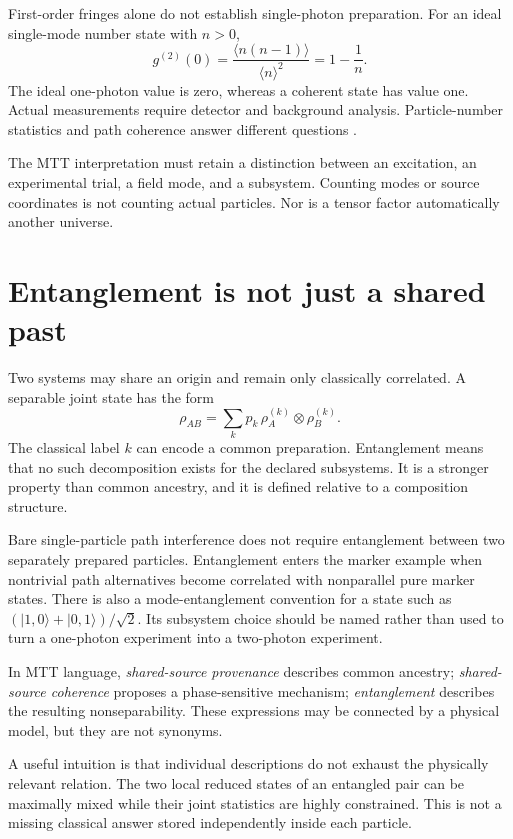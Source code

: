 \documentclass[11pt,a4paper]{article}
\newcommand{\ket}[1]{\lvert #1\rangle}
\begin{document}
First-order fringes alone do not establish single-photon preparation. For an ideal single-mode number state with \(n>0\),
\begin{equation}
g^{(2)}(0)=\frac{\langle n(n-1)\rangle}{\langle n\rangle^2}
         =1-\frac1n.
\end{equation}
The ideal one-photon value is zero, whereas a coherent state has value one. Actual measurements require detector and background analysis. Particle-number statistics and path coherence answer different questions \cite{Glauber,Grangier}.

The MTT interpretation must retain a distinction between an excitation, an experimental trial, a field mode, and a subsystem. Counting modes or source coordinates is not counting actual particles. Nor is a tensor factor automatically another universe.

\section{Entanglement is not just a shared past}
\label{sec:entanglement}
Two systems may share an origin and remain only classically correlated. A separable joint state has the form
\begin{equation}
\rho_{AB}=\sum_k p_k\,\rho_A^{(k)}\otimes\rho_B^{(k)}.
\end{equation}
The classical label \(k\) can encode a common preparation. Entanglement means that no such decomposition exists for the declared subsystems. It is a stronger property than common ancestry, and it is defined relative to a composition structure.

Bare single-particle path interference does not require entanglement between two separately prepared particles. Entanglement enters the marker example when nontrivial path alternatives become correlated with nonparallel pure marker states. There is also a mode-entanglement convention for a state such as \((\ket{1,0}+\ket{0,1})/\sqrt2\). Its subsystem choice should be named rather than used to turn a one-photon experiment into a two-photon experiment.

In MTT language, \emph{shared-source provenance} describes common ancestry; \emph{shared-source coherence} proposes a phase-sensitive mechanism; \emph{entanglement} describes the resulting nonseparability. These expressions may be connected by a physical model, but they are not synonyms.

A useful intuition is that individual descriptions do not exhaust the physically relevant relation. The two local reduced states of an entangled pair can be maximally mixed while their joint statistics are highly constrained. This is not a missing classical answer stored independently inside each particle.
\end{document}
